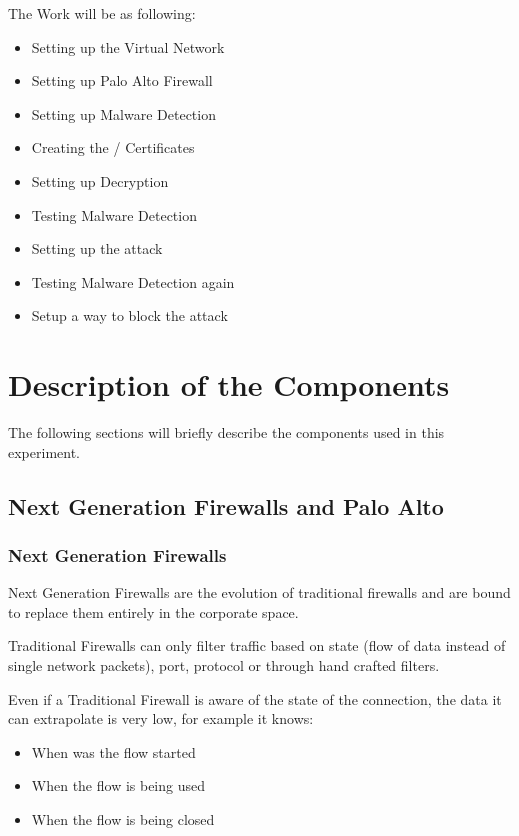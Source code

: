 The Work will be as following:

\begin{itemize}
    \item Setting up the Virtual Network
    \item Setting up Palo Alto Firewall
    \item Setting up Malware Detection
    \item Creating the / Certificates
    \item Setting up Decryption
    \item Testing Malware Detection
    \item Setting up the  attack
    \item Testing Malware Detection again
    \item Setup a way to block the attack
\end{itemize}

\chapter{Description of the Components}

The following sections will briefly describe the components used in this experiment.

\section{Next Generation Firewalls and Palo Alto}

\subsection{Next Generation Firewalls}

Next Generation Firewalls are the evolution of traditional firewalls and are bound to replace them entirely in the corporate space.

Traditional Firewalls can only filter traffic based on state (flow of data instead of single network packets), port, protocol or through hand crafted filters.

Even if a Traditional Firewall is aware of the state of the connection, the data it can extrapolate is very low, for example it knows:

\begin{itemize}
 \item When was the flow started
 \item When the flow is being used
 \item When the flow is being closed
\end{itemize}

